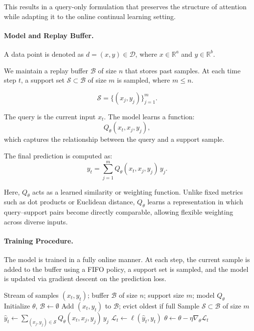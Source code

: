 \documentclass{article}
\begin{document}
This results in a query-only formulation that preserves the structure of attention while adapting it to the online continual learning setting.

\paragraph{Model and Replay Buffer.}
A data point is denoted as $d = (x, y) \in \mathcal{D}$, where $x \in \mathbb{R}^a$ and $y \in \mathbb{R}^b$.

We maintain a replay buffer $\mathcal{B}$ of size $n$ that stores past samples. At each time step $t$, a support set $\mathcal{S} \subset \mathcal{B}$ of size $m$ is sampled, where $m \le n$.

\begin{equation}
\mathcal{S} = \{(x_j, y_j)\}_{j=1}^{m}.
\end{equation}

The query is the current input $x_t$. The model learns a function:
\begin{equation}
Q_\theta(x_t, x_j, y_j),
\end{equation}
which captures the relationship between the query and a support sample.

The final prediction is computed as:
\begin{equation}
\hat{y}_t = \sum_{j=1}^{m} Q_\theta(x_t, x_j, y_j) \, y_j.
\label{eq:query_based_model}
\end{equation}

Here, $Q_\theta$ acts as a learned similarity or weighting function. Unlike fixed metrics such as dot products or Euclidean distance, $Q_\theta$ learns a representation in which query–support pairs become directly comparable, allowing flexible weighting across diverse inputs.

\paragraph{Training Procedure.}
The model is trained in a fully online manner. At each step, the current sample is added to the buffer using a FIFO policy, a support set is sampled, and the model is updated via gradient descent on the prediction loss.

\begin{algorithm}[ht]
\caption{Query-Only Attention with Replay Buffer}
\label{alg:query_only}
\begin{algorithmic}[1]
\Require Stream of samples $(x_t,y_t)$; buffer $\mathcal{B}$ of size $n$; support size $m$; model $Q_\theta$
\State Initialize $\theta$, $\mathcal{B} \gets \emptyset$
    \State Add $(x_t,y_t)$ to $\mathcal{B}$; evict oldest if full
    \State Sample $\mathcal{S} \subset \mathcal{B}$ of size $m$
    \State $\hat{y}_t \gets \sum_{(x_j,y_j)\in \mathcal{S}} Q_\theta(x_t,x_j,y_j)\,y_j$
    \State $\mathcal{L}_t \gets \ell(\hat{y}_t, y_t)$
    \State $\theta \gets \theta - \eta \nabla_\theta \mathcal{L}_t$
\EndFor
\end{algorithmic}
\end{algorithm}
\end{document}
